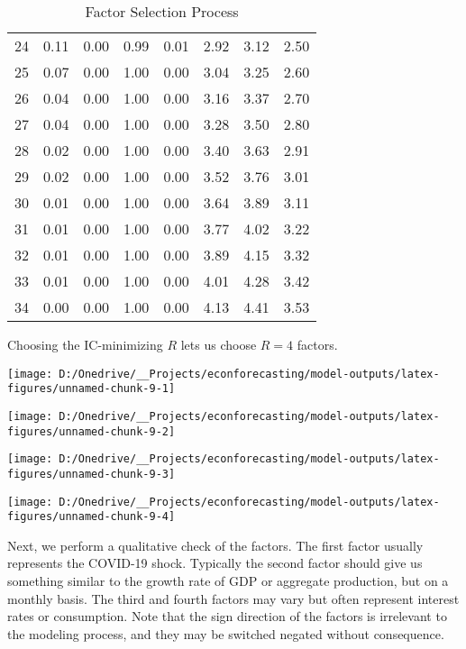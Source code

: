\documentclass[11pt, letterpaper]{article}\usepackage[]{graphicx}\usepackage[]{color}
\begin{document}
\begin{table}[H]
\begin{tabular}{cccccccc}
   24 & 0.11 & 0.00 & 0.99 & 0.01 & 2.92 & 3.12 & 2.50 \\ 
   25 & 0.07 & 0.00 & 1.00 & 0.00 & 3.04 & 3.25 & 2.60 \\ 
   26 & 0.04 & 0.00 & 1.00 & 0.00 & 3.16 & 3.37 & 2.70 \\ 
   27 & 0.04 & 0.00 & 1.00 & 0.00 & 3.28 & 3.50 & 2.80 \\ 
   28 & 0.02 & 0.00 & 1.00 & 0.00 & 3.40 & 3.63 & 2.91 \\ 
   29 & 0.02 & 0.00 & 1.00 & 0.00 & 3.52 & 3.76 & 3.01 \\ 
   30 & 0.01 & 0.00 & 1.00 & 0.00 & 3.64 & 3.89 & 3.11 \\ 
   31 & 0.01 & 0.00 & 1.00 & 0.00 & 3.77 & 4.02 & 3.22 \\ 
   32 & 0.01 & 0.00 & 1.00 & 0.00 & 3.89 & 4.15 & 3.32 \\ 
   33 & 0.01 & 0.00 & 1.00 & 0.00 & 4.01 & 4.28 & 3.42 \\ 
   34 & 0.00 & 0.00 & 1.00 & 0.00 & 4.13 & 4.41 & 3.53 \\ 
   \hline
\end{tabular}
\endgroup
\caption{Factor Selection Process} 
\end{table}


Choosing the IC-minimizing $R$ lets us choose $R = 4$ factors.



{\centering \texttt{[image: D:/Onedrive/\_\_Projects/econforecasting/model-outputs/latex-figures/unnamed-chunk-9-1]} 

}




{\centering \texttt{[image: D:/Onedrive/\_\_Projects/econforecasting/model-outputs/latex-figures/unnamed-chunk-9-2]} 

}




{\centering \texttt{[image: D:/Onedrive/\_\_Projects/econforecasting/model-outputs/latex-figures/unnamed-chunk-9-3]} 

}




{\centering \texttt{[image: D:/Onedrive/\_\_Projects/econforecasting/model-outputs/latex-figures/unnamed-chunk-9-4]} 

}




Next, we perform a qualitative check of the factors. The first factor usually represents the COVID-19 shock. Typically the second factor should give us something similar to the growth rate of GDP or aggregate production, but on a monthly basis. The third and fourth factors may vary but often represent interest rates or consumption. Note that the sign direction of the factors is irrelevant to the modeling process, and they may be switched negated without consequence. 
\end{document}
